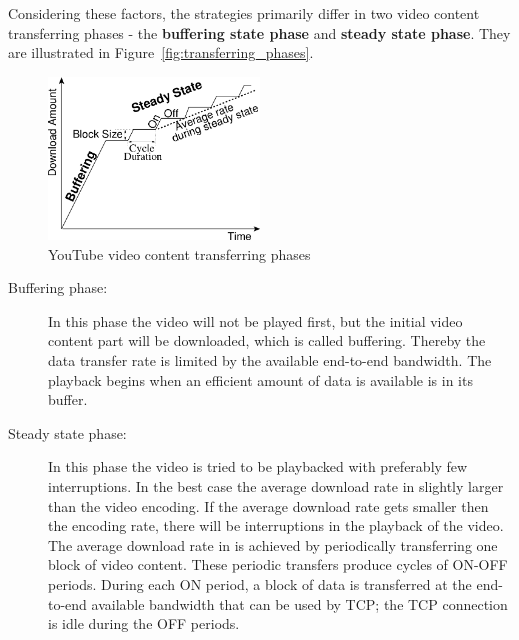 Considering these factors, the strategies primarily differ in two video content transferring phases - the \textbf{buffering state phase} and \textbf{steady state phase}. They are illustrated in Figure~\vref{fig:transferring_phases}.

\begin{figure}[htbp]
  \begin{minipage}{\textwidth}
    \begin{center}
      \includegraphics[width=0.5\textwidth]{pictures/transferring_phases.png}
      \caption[test]{YouTube video content transferring phases\footnotemark[2]}
    \label{fig:transferring_phases}
    \end{center}
  \end{minipage}
\end{figure}


\begin{description}
  \item[Buffering phase:] In this phase the video will not be played first, but the initial video content part will be downloaded, which is called buffering. Thereby the data transfer rate is limited by the available end-to-end bandwidth. The playback begins when an efficient amount of data is available is in its buffer.

  \item[Steady state phase:] In this phase the video is tried to be playbacked with preferably few interruptions. In the best case the average download rate in slightly larger than the video encoding. If the average download rate gets smaller then the encoding rate, there will be interruptions in the playback of the video. The average download rate in  is achieved by periodically transferring one block of video content. These periodic transfers produce cycles of ON-OFF periods. During each ON period, a block of data is transferred at the end-to-end available bandwidth that can be used by TCP; the TCP connection is idle during the OFF periods.
\end{description}

